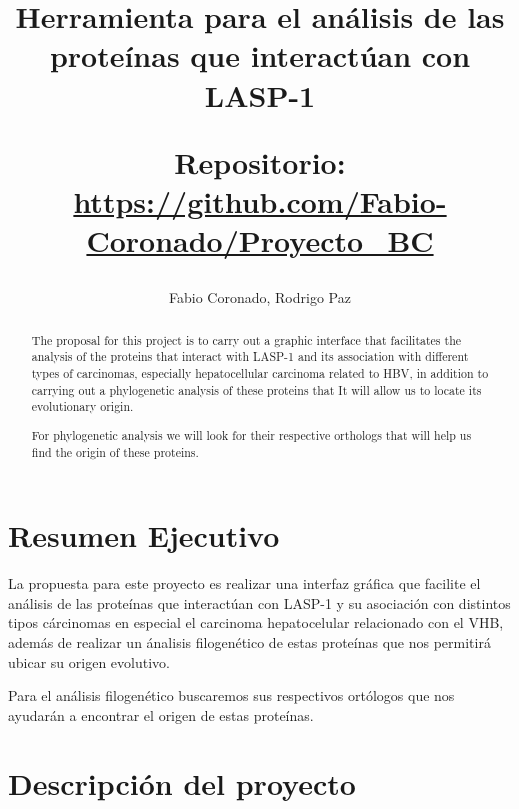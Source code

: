 \documentclass[twocolumn,twoside,12pt]{article}
\title{Herramienta para el an\'alisis de las prote\'inas que interact\'uan con LASP-1\\
 \begin{large} 
  Repositorio: \url{https://github.com/Fabio-Coronado/Proyecto_BC}
\end{large}}
\author{Fabio Coronado,  Rodrigo Paz }
\begin{document}
\maketitle


\begin{abstract}

The proposal for this project is to carry out a graphic interface that facilitates the analysis of the proteins that interact with LASP-1 and its association with different types of carcinomas, especially hepatocellular carcinoma related to HBV, in addition to carrying out a phylogenetic analysis of these proteins that It will allow us to locate its evolutionary origin.

For phylogenetic analysis we will look for their respective orthologs that will help us find the origin of these proteins.
\end{abstract}
\section{Resumen Ejecutivo}

La propuesta para este proyecto es realizar una interfaz gr\'afica que facilite el an\'alisis de las prote\'inas que interact\'uan con LASP-1 y su asociaci\'on con distintos tipos c\'arcinomas en especial el carcinoma hepatocelular relacionado con el VHB, adem\'as de
realizar un \'analisis filogen\'etico de estas prote\'inas que nos permitir\'a ubicar su origen evolutivo.

Para el an\'alisis filogen\'etico buscaremos sus respectivos ort\'ologos que nos ayudar\'an a encontrar el origen de estas prote\'inas.\\




\section{Descripci\'on del proyecto}
\end{document}
